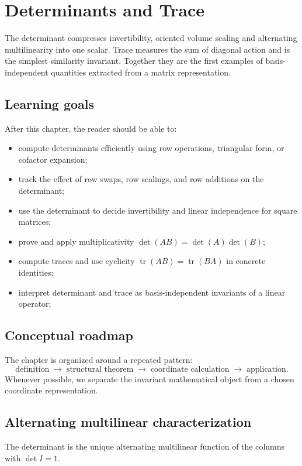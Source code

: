 \chapter{Determinants and Trace}
\label{ch:i08-determinants-and-trace}

The determinant compresses invertibility, oriented volume scaling and alternating multilinearity into one scalar. Trace measures the sum of diagonal action and is the simplest similarity invariant. Together they are the first examples of basis-independent quantities extracted from a matrix representation.

\section*{Learning goals}
After this chapter, the reader should be able to:
\begin{itemize}
\item compute determinants efficiently using row operations, triangular form, or cofactor expansion;
\item track the effect of row swaps, row scalings, and row additions on the determinant;
\item use the determinant to decide invertibility and linear independence for square matrices;
\item prove and apply multiplicativity \(\det(AB)=\det(A)\det(B)\);
\item compute traces and use cyclicity \(\operatorname{tr}(AB)=\operatorname{tr}(BA)\) in concrete identities;
\item interpret determinant and trace as basis-independent invariants of a linear operator;
\end{itemize}
\section*{Conceptual roadmap}
The chapter is organized around a repeated pattern:
\[
\boxed{\text{definition}\;\longrightarrow\;\text{structural theorem}\;\longrightarrow\;\text{coordinate calculation}\;\longrightarrow\;\text{application}.}
\]
Whenever possible, we separate the invariant mathematical object from a chosen coordinate representation.

\section{Alternating multilinear characterization}
The determinant is the unique alternating multilinear function of the columns with $\det I=1$.

